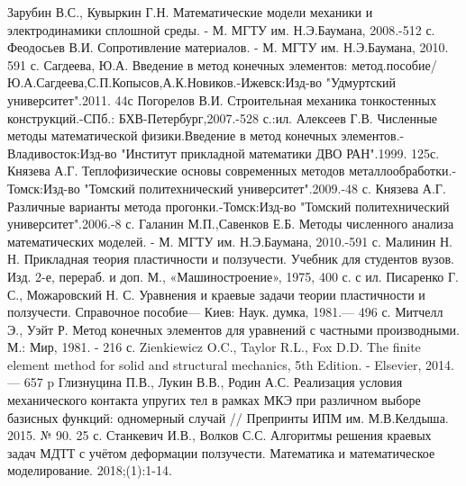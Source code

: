 \documentclass[a4paper, 14pt]{extarticle}
\begin{document}
\renewcommand{\refname}{\centering\textbf\selectfont\large СПИСОК ИСПОЛЬЗОВАННЫХ ИСТОЧНИКОВ} 
\newpage
{}
\begin{thebibliography}{9}
  Зарубин В.С., Кувыркин Г.Н. Математические модели механики и электродинамики сплошной среды. - М. МГТУ им. Н.Э.Баумана, 2008.-512 с.
  Феодосьев В.И. Сопротивление материалов. - М. МГТУ им. Н.Э.Баумана, 2010. 591 с.
  Сагдеева, Ю.А. Введение в метод конечных элементов: метод.пособие/Ю.А.Сагдеева,С.П.Копысов,А.К.Новиков.-Ижевск:Изд-во "Удмуртский университет".2011. 44с
  Погорелов В.И. Строительная механика тонкостенных конструкций.-СПб.: БХВ-Петербург,2007.-528 с.:ил.
  Алексеев Г.В. Численные методы математической физики.Введение в метод конечных элементов.-Владивосток:Изд-во "Институт прикладной математики ДВО РАН".1999. 125с.
  Князева А.Г. Теплофизические основы современных методов металлообработки.-Томск:Изд-во "Томский политехнический университет".2009.-48 с.
  Князева А.Г. Различные варианты метода прогонки.-Томск:Изд-во "Томский политехнический университет".2006.-8 с.
  Галанин М.П.,Савенков Е.Б. Методы численного анализа математических моделей. - М. МГТУ им. Н.Э.Баумана, 2010.-591 с.
  Малинин Н. Н. Прикладная теория пластичности и ползучести. Учебник для студентов вузов. Изд. 2-е, перераб. и доп. М., «Машиностроение», 1975, 400 с. с ил.
 Писаренко Г. С., Можаровский Н. С. Уравнения и краевые задачи теории пластичности и ползучести. Справочное пособие— Киев: Наук. думка, 1981.— 496 с.
 Митчелл Э., Уэйт Р. Метод конечных элементов для уравнений с частными производными. М.: Мир, 1981. - 216 с.
 Zienkiewicz O.C., Taylor R.L., Fox D.D. The finite element method for solid and structural mechanics, 5th Edition. - Elsevier, 2014. — 657 p
 Глизнуцина П.В., Лукин В.В., Родин А.С. Реализация условия механического контакта упругих тел в рамках МКЭ при различном выборе базисных функций: одномерный случай // Препринты ИПМ им. М.В.Келдыша. 2015. № 90. 25 с.
 Станкевич И.В., Волков С.С. Алгоритмы решения краевых задач МДТТ с учётом деформации ползучести. Математика и математическое моделирование. 2018;(1):1-14.

\end{thebibliography}
\end{document}
